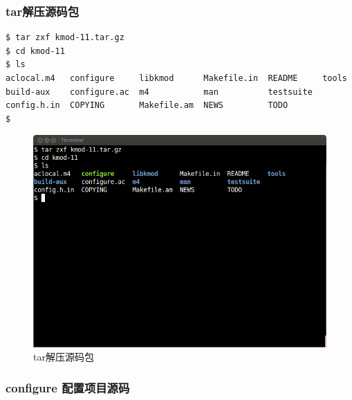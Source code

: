 \documentclass[11pt,a4paper]{article}
\makeatletter
\def\maxwidth{\ifdim\Gin@nat@width>\linewidth\linewidth
\else\Gin@nat@width\fi}
\let\Oldincludegraphics\includegraphics
\renewcommand{\includegraphics}[1]{\Oldincludegraphics[width=\maxwidth]{#1}}
\makeatother
\begin{document}
\subsubsection{tar解压源码包}

{\begin{shaded}\begin{verbatim}
$ tar zxf kmod-11.tar.gz 
$ cd kmod-11
$ ls
aclocal.m4   configure     libkmod      Makefile.in  README     tools
build-aux    configure.ac  m4           man          testsuite
config.h.in  COPYING       Makefile.am  NEWS         TODO
$ 
\end{verbatim}\end{shaded}}
\begin{figure}[htbp]
\centering
\includegraphics{./pictures/1-2-tar.png}
\caption{tar解压源码包}
\end{figure}

\subsubsection{configure 配置项目源码}
\end{document}
